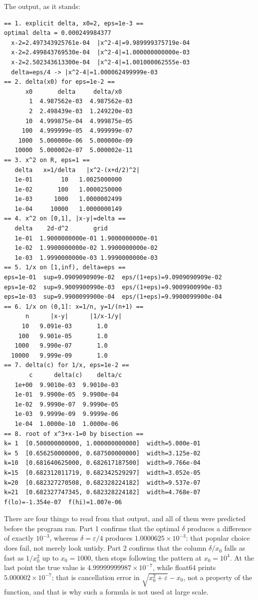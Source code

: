 \newpage
The output, as it stands:

\begin{verbatim}
== 1. explicit delta, x0=2, eps=1e-3 ==
optimal delta = 0.000249984377
  x-2=2.497343925761e-04  |x^2-4|=9.989999375719e-04
  x-2=2.499843769530e-04  |x^2-4|=1.000000000000e-03
  x-2=2.502343613300e-04  |x^2-4|=1.001000062555e-03
  delta=eps/4 -> |x^2-4|=1.000062499999e-03
== 2. delta(x0) for eps=1e-2 ==
      x0       delta     delta/x0
       1  4.987562e-03  4.987562e-03
       2  2.498439e-03  1.249220e-03
      10  4.999875e-04  4.999875e-05
     100  4.999999e-05  4.999999e-07
    1000  5.000000e-06  5.000000e-09
   10000  5.000002e-07  5.000002e-11
== 3. x^2 on R, eps=1 ==
   delta   x=1/delta   |x^2-(x+d/2)^2|
   1e-01        10   1.0025000000
   1e-02       100   1.0000250000
   1e-03      1000   1.0000002499
   1e-04     10000   1.0000000149
== 4. x^2 on [0,1], |x-y|=delta ==
   delta    2d-d^2       grid
   1e-01  1.9000000000e-01 1.9000000000e-01
   1e-02  1.9900000000e-02 1.9900000000e-02
   1e-03  1.9990000000e-03 1.9990000000e-03
== 5. 1/x on [1,inf), delta=eps ==
eps=1e-01  sup=9.0909090909e-02  eps/(1+eps)=9.0909090909e-02
eps=1e-02  sup=9.9009900990e-03  eps/(1+eps)=9.9009900990e-03
eps=1e-03  sup=9.9900099900e-04  eps/(1+eps)=9.9900099900e-04
== 6. 1/x on (0,1]: x=1/n, y=1/(n+1) ==
      n      |x-y|      |1/x-1/y|
     10   9.091e-03       1.0
    100   9.901e-05       1.0
   1000   9.990e-07       1.0
  10000   9.999e-09       1.0
== 7. delta(c) for 1/x, eps=1e-2 ==
       c      delta(c)    delta/c
   1e+00  9.9010e-03  9.9010e-03
   1e-01  9.9900e-05  9.9900e-04
   1e-02  9.9990e-07  9.9990e-05
   1e-03  9.9999e-09  9.9999e-06
   1e-04  1.0000e-10  1.0000e-06
== 8. root of x^3+x-1=0 by bisection ==
k= 1  [0.500000000000, 1.000000000000]  width=5.000e-01
k= 5  [0.656250000000, 0.687500000000]  width=3.125e-02
k=10  [0.681640625000, 0.682617187500]  width=9.766e-04
k=15  [0.682312011719, 0.682342529297]  width=3.052e-05
k=20  [0.682327270508, 0.682328224182]  width=9.537e-07
k=21  [0.682327747345, 0.682328224182]  width=4.768e-07
f(lo)=-1.354e-07  f(hi)=1.007e-06
\end{verbatim}

There are four things to read from that output, and all of them were predicted before the
program ran. Part 1 confirms that the optimal $\delta$ produces a difference of exactly
$10^{-3}$, whereas $\delta=\varepsilon/4$ produces $1.0000625\times10^{-3}$:
that popular choice does fail, not merely look untidy. Part 2 confirms that
the column $\delta/x_{0}$ falls as fast as $1/x_{0}^{2}$ up to $x_{0}=1000$, then stops
following the pattern at $x_{0}=10^{4}$. At the last point the true value is
$4.99999999987\times10^{-7}$, while float64 prints $5.000002\times10^{-7}$; that is
cancellation error in $\sqrt{x_{0}^{2}+\varepsilon}-x_{0}$, not a property of the function, and
that is why such a formula is not used at large scale.

